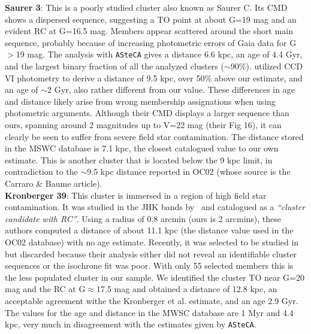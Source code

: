 \documentclass[referee]{aa}
\begin{document}
  \noindent \textbf{Saurer 3}: This is a poorly studied cluster also known as Saurer C.
  Its CMD shows a dispersed sequence, suggesting a TO point at about G=19 mag
  and an evident RC at G=16.5 mag. Members appear scattered around the short
  main sequence, probably because of increasing photometric errors of Gaia data
  for G$>$19 mag.
  The analysis with \texttt{ASteCA} gives a distance 6.6 kpc, an age of 4.4
  Gyr, and the largest binary fraction of all the analyzed clusters 
  ($\sim$90\%).
  \cite{Carraro_2003} utilized CCD VI photometry to derive a distance of 9.5
  kpc, over 50\% above our estimate, and an age of $\sim$2 Gyr, also rather
  different from our value. These differences in age and distance likely
  arise from wrong membership assignations when using photometric
  arguments. Although their CMD displays a larger sequence than
  ours, spanning around 2 magnitudes up to V=22 mag (their Fig 16), it can
  clearly be seen to suffer from severe field star contamination.
  The distance stored in the MSWC database is 7.1 kpc, the closest catalogued
  value to our own estimate. This is another cluster that is located below the 9
  kpc limit, in contradiction to the $\sim$9.5 kpc distance reported in
  OC02 (whose source is the Carraro \& Baume article).\\

  \noindent \textbf{Kronberger 39}: This cluster is immersed in a region of high field
  star contamination. It was studied in the JHK bands by~\cite{Kronberger_2006}
  and catalogued as a \emph{``cluster candidate with RC''}. Using a radius of 0.8
  arcmin (ours is 2 arcmins), these authors computed a distance of about 11.1
  kpc (the distance value used in the OC02 database) with no age estimate.
  Recently, it was selected to be studied in~\cite{Monteiro_2020} but
  discarded because their analysis either did not reveal an identifiable cluster
  sequences or the isochrone fit was poor.
  With only 55 selected members this is the less populated cluster in our
  sample. We identified the cluster TO near G=20 mag and the RC at
  G$\approx$17.5 mag and obtained a distance of 12.8 kpc, an acceptable
  agreement withe the Kronberger et al. estimate, and an age 2.9 Gyr.
  The values for the age and distance in the MWSC database are 1 Myr and 4.4
  kpc, very much in disagreement with the estimates given by \texttt{ASteCA}.\\
\end{document}
